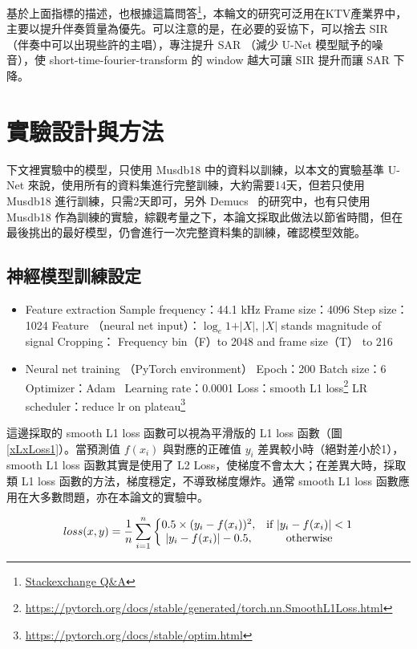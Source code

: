 基於上面指標的描述，也根據這篇問答\footnote{\href{https://dsp.stackexchange.com/questions/9610/snr-calculation-in-audio-reconstruction-and-what-is-an-acceptable-value}{Stackexchange Q\&A}}，本輪文的研究可泛用在KTV產業界中，主要以提升伴奏質量為優先。可以注意的是，在必要的妥協下，可以捨去 SIR （伴奏中可以出現些許的主唱），專注提升 SAR （減少 U-Net 模型賦予的噪音），使 short-time-fourier-transform 的 window 越大可讓 SIR 提升而讓 SAR 下降。

\section{實驗設計與方法}
下文裡實驗中的模型，只使用 Musdb18 中的資料以訓練，以本文的實驗基準 U-Net 來說，使用所有的資料集進行完整訓練，大約需要14天，但若只使用 Musdb18 進行訓練，只需2天即可，另外 Demucs~\cite{defossez2019music} 的研究中，也有只使用 Musdb18 作為訓練的實驗，綜觀考量之下，本論文採取此做法以節省時間，但在最後挑出的最好模型，仍會進行一次完整資料集的訓練，確認模型效能。

\subsection{神經模型訓練設定}
\begin{itemize}
    \item Feature extraction
    \subitem Sample frequency：44.1 kHz
    \subitem Frame size：4096
    \subitem Step size：1024
    \subitem Feature （neural net input）：$\log_e{1+\vert X\vert} $, $\vert X\vert$ stands magnitude of signal
    \subitem Cropping： Frequency bin（F）to 2048 and frame size（T） to 216
    \item Neural net training （PyTorch environment）
    \subitem Epoch：200
    \subitem Batch size：6
    \subitem Optimizer：Adam~\cite{kingma2014adam}
    \subitem Learning rate：0.0001
    \subitem Loss：smooth L1 loss\footnote{\url{https://pytorch.org/docs/stable/generated/torch.nn.SmoothL1Loss.html}}
    \subitem LR scheduler：reduce lr on plateau\footnote{\url{https://pytorch.org/docs/stable/optim.html}}
\end{itemize}
這邊採取的 smooth L1 loss 函數可以視為平滑版的 L1 loss 函數（圖\ref{xLxLoss1}）。當預測值 $f(x_i)$ 與對應的正確值 $y_i$ 差異較小時（絕對差小於1），smooth L1 loss 函數其實是使用了 L2 Loss，使梯度不會太大；在差異大時，採取類 L1 loss 函數的方法，梯度穩定，不導致梯度爆炸。通常 smooth L1 loss 函數應用在大多數問題，亦在本論文的實驗中。

\begin{equation*}
    loss(x,y)=\frac{1}{n}\sum_{i=1}^{n}\left\{\begin{matrix}
        0.5 \times (y_i-f(x_i))^2,& \textup{if}\ \vert y_i-f(x_i)\vert < 1\\ 
        \vert y_i-f(x_i)\vert -0.5,& \textup{otherwise}
    \end{matrix}\right.
\end{equation*}


